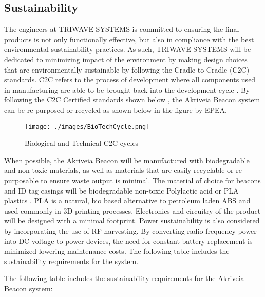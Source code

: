 \break
\subsection{Sustainability}
The engineers at TRIWAVE SYSTEMS is committed to ensuring the final products is not only functionally effective, but also in compliance with the best environmental sustainability practices. As such, TRIWAVE SYSTEMS will be dedicated to minimizing impact of the environment by making design choices that are environmentally sustainable by following the Cradle to Cradle (\Gls{C2C}) standards. C2C refers to the process of development where all components used in manufacturing are able to be brought back into the development cycle \cite{R23}. By following the C2C Certified standards shown below \cite{R25}, the Akriveia Beacon system can be re-purposed or recycled as shown below in the figure by EPEA.

\begin{figure}[H]
\centering
    \texttt{[image: ./images/BioTechCycle.png]}
    \caption{Biological and Technical C2C cycles}
\end{figure}

When possible, the Akriveia Beacon will be manufactured with biodegradable and non-toxic materials, as well as materials that are easily recyclable or re-purposable to ensure waste output is minimal. The material of choice for beacons and ID tag casings will be biodegradable non-toxic Polylactic acid or PLA plastics \cite{R25}. PLA is a natural, bio based alternative to petroleum laden ABS and used commonly in 3D printing processes. Electronics and circuitry of the product will be designed with a minimal footprint. Power sustainability is also considered by incorporating the use of RF harvesting. By converting radio frequency power into DC voltage to power devices, the need for constant battery replacement is minimized lowering maintenance costs. The following table includes the sustainability requirements for the system.

\break
The following table includes the sustainability requirements for the Akriveia Beacon system:

